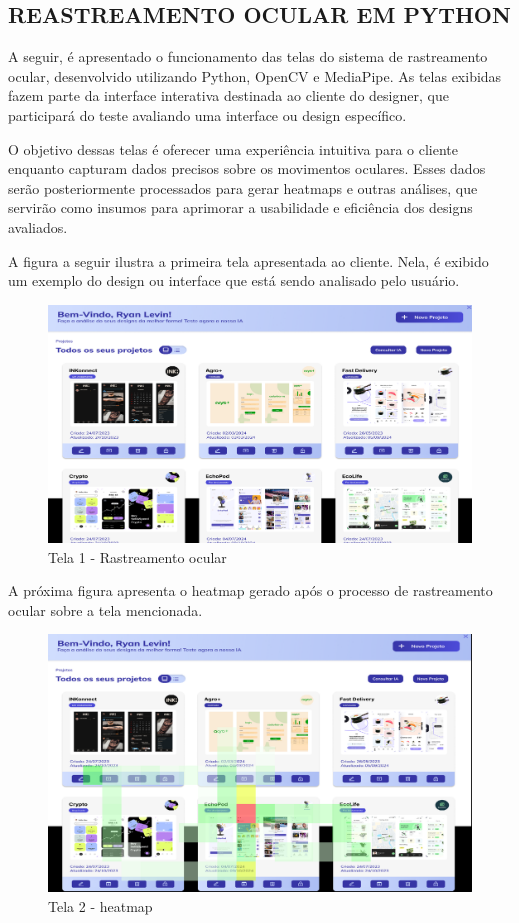 \subsection*{REASTREAMENTO OCULAR EM PYTHON}
A seguir, é apresentado o funcionamento das telas do sistema de rastreamento ocular, desenvolvido utilizando Python, OpenCV e MediaPipe. As telas exibidas fazem parte da interface interativa destinada ao cliente do designer, que participará do teste avaliando uma interface ou design específico.

O objetivo dessas telas é oferecer uma experiência intuitiva para o cliente enquanto capturam dados precisos sobre os movimentos oculares. Esses dados serão posteriormente processados para gerar heatmaps e outras análises, que servirão como insumos para aprimorar a usabilidade e eficiência dos designs avaliados.

A figura a seguir ilustra a primeira tela apresentada ao cliente. Nela, é exibido um exemplo do design ou interface que está sendo analisado pelo usuário.

\begin{figure}[H]
    \centering
    \caption{Tela 1 - Rastreamento ocular}%
    \label{fig:pg-telaPython1}
    \includegraphics[width=0.72\linewidth]{Illustrations/python1.png}
\end{figure}

A próxima figura apresenta o heatmap gerado após o processo de rastreamento ocular sobre a tela mencionada.

\begin{figure}[H]
    \centering
    \caption{Tela 2 - heatmap}%
    \label{fig:pg-telaPython2}
    \includegraphics[width=0.72\linewidth]{Illustrations/python2.png}
\end{figure}

